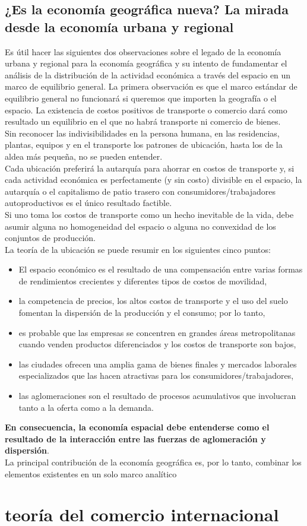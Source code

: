\subsection{¿Es la economía geográfica nueva? La mirada desde la economía urbana y regional}
Es útil hacer las siguientes dos observaciones sobre el legado de la economía urbana y regional para la economía geográfica y su intento de fundamentar el análisis de la distribución de la actividad económica a través del espacio en un marco de equilibrio general. La primera observación es que el marco estándar de equilibrio general no funcionará si queremos que importen la geografía o el espacio. La existencia de costos positivos de transporte o comercio dará como resultado un equilibrio en el que no habrá transporte ni comercio de bienes.\\
Sin reconocer las indivisibilidades en la persona humana, en las residencias, plantas, equipos y en el transporte los patrones de ubicación, hasta los de la aldea más pequeña, no se pueden entender.\\
Cada ubicación preferirá la autarquía para ahorrar en costos de transporte y, si cada actividad económica es perfectamente (y sin costo) divisible en el espacio, la autarquía o el capitalismo de patio trasero con consumidores/trabajadores autoproductivos es el único resultado factible.\\
Si uno toma los costos de transporte como un hecho inevitable de la vida, debe asumir alguna no homogeneidad del espacio o alguna no convexidad de los conjuntos de producción.\\
La teoría de la ubicación se puede resumir en los siguientes cinco puntos:
\begin{itemize}
    \item El espacio económico es el resultado de una compensación entre varias formas de rendimientos crecientes y diferentes tipos de costos de movilidad,
    \item la competencia de precios, los altos costos de transporte y el uso del suelo fomentan la dispersión de la producción y el consumo; por lo tanto,
    \item es probable que las empresas se concentren en grandes áreas metropolitanas cuando venden productos diferenciados y los costos de transporte son bajos,
    \item las ciudades ofrecen una amplia gama de bienes finales y mercados laborales especializados que las hacen atractivas para los consumidores/trabajadores,
    \item las aglomeraciones son el resultado de procesos acumulativos que involucran tanto a la oferta como a la demanda.
\end{itemize}
\textbf{En consecuencia, la economía espacial debe entenderse como el resultado de la interacción entre las fuerzas de aglomeración y dispersión}.\\
La principal contribución de la economía geográfica es, por lo tanto, combinar los elementos existentes en un solo marco analítico

\section{teoría del comercio internacional}
